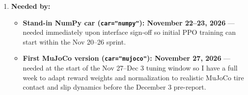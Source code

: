 \documentclass[11pt]{article}
\begin{document}
\begin{enumerate}[leftmargin=1.5em, itemsep=0.25em]
    \item \textbf{Needed by:} 
    \begin{itemize}[leftmargin=1.5em, itemsep=0.15em]
        \item \textbf{Stand-in NumPy car (\texttt{car="numpy"}): November 22--23, 2026} — needed immediately upon interface sign-off so initial PPO training can start within the Nov 20--26 sprint.
        \item \textbf{First MuJoCo version (\texttt{car="mujoco"}): November 27, 2026} — needed at the start of the Nov 27--Dec 3 tuning window so I have a full week to adapt reward weights and normalization to realistic MuJoCo tire contact and slip dynamics before the December 3 pre-report.
    \end{itemize}
\end{enumerate}

\end{document}
